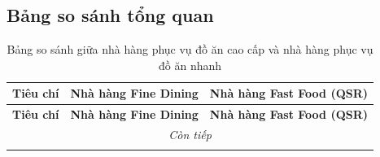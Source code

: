 \subsection*{Bảng so sánh tổng quan}

\begin{longtable}{| m{3.5cm} | >{\RaggedRight}m{6.5cm} | >{\RaggedRight}m{6.5cm} |}
	\caption{Bảng so sánh giữa nhà hàng phục vụ đồ ăn cao cấp và nhà hàng phục vụ đồ ăn nhanh} \label{tab:comparison_detail}                                                                                                                                                                                                                                                                                                                                                                                                                                                                                         \\
	\hline
	\textbf{Tiêu chí}                    & \textbf{Nhà hàng Fine Dining}                                                                                                                                                                                                                                                           & \textbf{Nhà hàng Fast Food (QSR)}                                                                                                                                                                                                                                               \\
	\hline
	\endfirsthead

	\hline
	\textbf{Tiêu chí}                    & \textbf{Nhà hàng Fine Dining}                                                                                                                                                                                                                                                           & \textbf{Nhà hàng Fast Food (QSR)}                                                                                                                                                                                                                                               \\
	\hline
	\endhead

	\hline
	\multicolumn{3}{|c|}{\textit{Còn tiếp}}                                                                                                                                                                                                                                                                                                                                                                                                                                                                                                                                                                          \\
	\hline
	\endfoot


\end{longtable}
